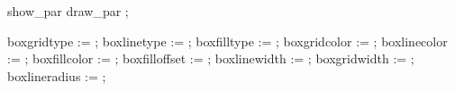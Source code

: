   \iftracepositions show_par \else draw_par \fi ;
\stopuseMPgraphic

   boxgridtype   :=  ;
   boxlinetype   :=  ;
   boxfilltype   :=  ;
   boxgridcolor  :=  ;
   boxlinecolor  :=  ;
   boxfillcolor  :=  ;
   boxfilloffset :=  ;
   boxlinewidth  :=  ;
   boxgridwidth  :=  ;
   boxlineradius :=  ;
\stopuseMPgraphic

\stopuseMPgraphic



\ifx\MPparcounter\undefined \newcounter\MPparcounter \fi

\def\MPself     {\MPvar{self}}
\def\MPbself    {b:\MPself}
\def\MPeself    {e:\MPself}
\def\MPwself    {w:\MPself}
\def\MPparanchor{p:\MPparcounter}

\def\MPl#1{\MPplus{#1}20}
\def\MPr#1{\MPplus{#1}30}

